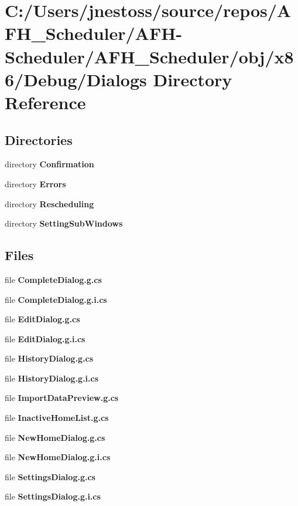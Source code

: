 \section{C\+:/\+Users/jnestoss/source/repos/\+A\+F\+H\+\_\+\+Scheduler/\+A\+F\+H-\/\+Scheduler/\+A\+F\+H\+\_\+\+Scheduler/obj/x86/\+Debug/\+Dialogs Directory Reference}
\label{dir_8fb6933e765f5895dd3278db81f8c3e7}
\subsection*{Directories}
\begin{DoxyCompactItemize}
\item 
directory \textbf{ Confirmation}
\item 
directory \textbf{ Errors}
\item 
directory \textbf{ Rescheduling}
\item 
directory \textbf{ Setting\+Sub\+Windows}
\end{DoxyCompactItemize}
\subsection*{Files}
\begin{DoxyCompactItemize}
\item 
file \textbf{ Complete\+Dialog.\+g.\+cs}
\item 
file \textbf{ Complete\+Dialog.\+g.\+i.\+cs}
\item 
file \textbf{ Edit\+Dialog.\+g.\+cs}
\item 
file \textbf{ Edit\+Dialog.\+g.\+i.\+cs}
\item 
file \textbf{ History\+Dialog.\+g.\+cs}
\item 
file \textbf{ History\+Dialog.\+g.\+i.\+cs}
\item 
file \textbf{ Import\+Data\+Preview.\+g.\+cs}
\item 
file \textbf{ Inactive\+Home\+List.\+g.\+cs}
\item 
file \textbf{ New\+Home\+Dialog.\+g.\+cs}
\item 
file \textbf{ New\+Home\+Dialog.\+g.\+i.\+cs}
\item 
file \textbf{ Settings\+Dialog.\+g.\+cs}
\item 
file \textbf{ Settings\+Dialog.\+g.\+i.\+cs}
\end{DoxyCompactItemize}
